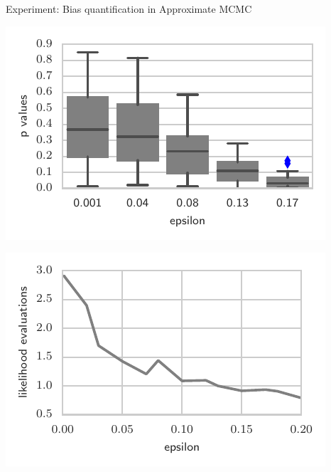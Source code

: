 \begin{frame}
\begin{columns}
\begin{column}{.32\linewidth}
\begin{block}{Experiment: Bias quantification in Approximate MCMC}
\begin{center}
\begin{minipage}{.450\linewidth}
\includegraphics[width=\textwidth]{../../presentation/img/Heiko1}\\
\end{minipage}
\begin{minipage}{.45\linewidth}
            \includegraphics[width=\textwidth]{../../presentation/img/Heiko2}
\end{minipage}
\end{center}



\end{block}
\end{column}
\end{columns}
\end{frame}
